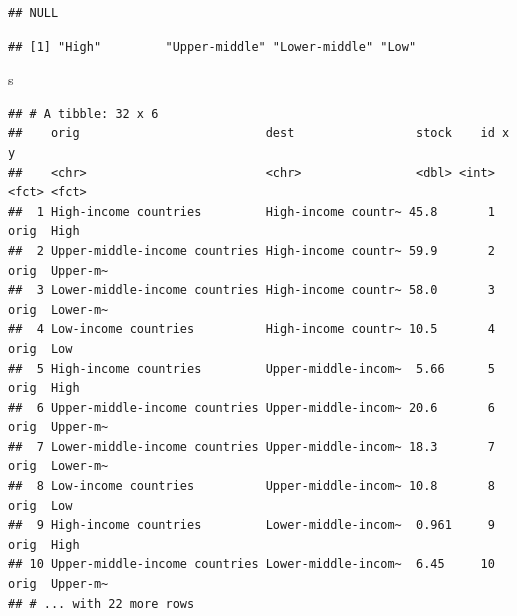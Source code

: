 \documentclass[
]{book}
\newenvironment{Shaded}{\begin{snugshade}}{\end{snugshade}}
\newcommand{\AttributeTok}[1]{\textcolor[rgb]{0.77,0.63,0.00}{#1}}
\newcommand{\FunctionTok}[1]{\textcolor[rgb]{0.00,0.00,0.00}{#1}}
\newcommand{\NormalTok}[1]{#1}
\newcommand{\OtherTok}[1]{\textcolor[rgb]{0.56,0.35,0.01}{#1}}
\newcommand{\SpecialCharTok}[1]{\textcolor[rgb]{0.00,0.00,0.00}{#1}}
\newcommand{\StringTok}[1]{\textcolor[rgb]{0.31,0.60,0.02}{#1}}
\begin{document}
\begin{Shaded}
\end{Shaded}

\begin{verbatim}
## NULL
\end{verbatim}

\begin{Shaded}
\end{Shaded}

\begin{verbatim}
## [1] "High"         "Upper-middle" "Lower-middle" "Low"
\end{verbatim}

\begin{Shaded}
\begin{Highlighting}[]
\NormalTok{s}
\end{Highlighting}
\end{Shaded}

\begin{verbatim}
## # A tibble: 32 x 6
##    orig                          dest                 stock    id x     y       
##    <chr>                         <chr>                <dbl> <int> <fct> <fct>   
##  1 High-income countries         High-income countr~ 45.8       1 orig  High    
##  2 Upper-middle-income countries High-income countr~ 59.9       2 orig  Upper-m~
##  3 Lower-middle-income countries High-income countr~ 58.0       3 orig  Lower-m~
##  4 Low-income countries          High-income countr~ 10.5       4 orig  Low     
##  5 High-income countries         Upper-middle-incom~  5.66      5 orig  High    
##  6 Upper-middle-income countries Upper-middle-incom~ 20.6       6 orig  Upper-m~
##  7 Lower-middle-income countries Upper-middle-incom~ 18.3       7 orig  Lower-m~
##  8 Low-income countries          Upper-middle-incom~ 10.8       8 orig  Low     
##  9 High-income countries         Lower-middle-incom~  0.961     9 orig  High    
## 10 Upper-middle-income countries Lower-middle-incom~  6.45     10 orig  Upper-m~
## # ... with 22 more rows
\end{verbatim}
\end{document}
